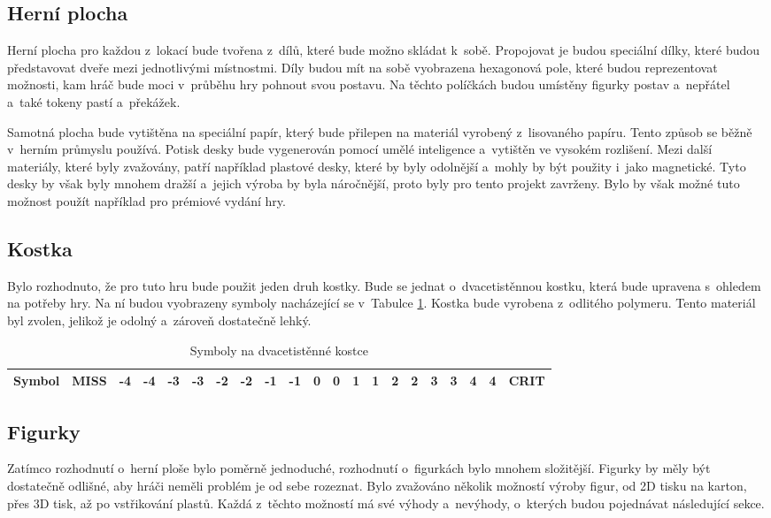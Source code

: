 \subsection{Herní plocha}
Herní plocha pro každou z~lokací bude tvořena z~dílů, které bude možno skládat k~sobě. Propojovat je budou speciální dílky, které budou představovat dveře mezi jednotlivými místnostmi. Díly budou mít na sobě vyobrazena hexagonová pole, které budou reprezentovat možnosti, kam hráč bude moci v~průběhu hry pohnout svou postavu. Na těchto políčkách budou umístěny figurky postav a~nepřátel a~také tokeny pastí a~překážek.

Samotná plocha bude vytištěna na speciální papír, který bude přilepen na materiál vyrobený z~lisovaného papíru. Tento způsob se běžně v~herním průmyslu používá. Potisk desky bude vygenerován pomocí umělé inteligence a~vytištěn ve vysokém rozlišení. Mezi další materiály, které byly zvažovány, patří například plastové desky, které by byly odolnější a~mohly by být použity i~jako magnetické. Tyto desky by však byly mnohem dražší a~jejich výroba by byla náročnější, proto byly pro tento projekt zavrženy. Bylo by však možné tuto možnost použít například pro prémiové vydání hry.

\subsection{Kostka}
Bylo rozhodnuto, že pro tuto hru bude použit jeden druh kostky. Bude se jednat o~dvacetistěnnou kostku, která bude upravena s~ohledem na potřeby hry. Na ní budou vyobrazeny symboly nacházející se v~Tabulce \ref{tab:dice_symbols}. Kostka bude vyrobena z~odlitého polymeru. Tento materiál byl zvolen, jelikož je odolný a~zároveň dostatečně lehký.

\begin{table}[H]
    \centering
    \begin{tabular}{*{21}{c}}
        \toprule
        \multicolumn{1}{c|}{\textbf{Symbol}} & MISS & -4 & -4 & -3 & -3 & -2 & -2 & -1 & -1 & 0 & 0 & 1 & 1 & 2 & 2 & 3 & 3 & 4 & 4 & CRIT \\
        \bottomrule
    \end{tabular}
    \caption{Symboly na dvacetistěnné kostce}
    \label{tab:dice_symbols}
\end{table}

\subsection{Figurky}
Zatímco rozhodnutí o~herní ploše bylo poměrně jednoduché, rozhodnutí o~figurkách bylo mnohem složitější. Figurky by měly být dostatečně odlišné, aby hráči neměli problém je od sebe rozeznat. Bylo zvažováno několik možností výroby figur, od 2D tisku na karton, přes 3D tisk, až po vstřikování plastů. Každá z~těchto možností má své výhody a~nevýhody, o~kterých budou pojednávat následující sekce.

